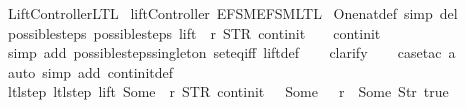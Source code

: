 %
\begin{isabellebody}%
%
%
\isadelimtheory
%
\endisadelimtheory
%
\isatagtheory
{}\isamarkupfalse%
\ Lift{\isacharunderscore}Controller{\isacharunderscore}LTL\isanewline
{}\ liftController{}\ {\isachardoublequoteopen}EFSM{\isachardot}EFSM{\isacharunderscore}LTL{\isachardoublequoteclose}\isanewline
{}%
\endisatagtheory
{\isafoldtheory}%
%
\isadelimtheory
\isanewline
%
\endisadelimtheory
\isanewline
{}\isamarkupfalse%
\ One{\isacharunderscore}nat{\isacharunderscore}def\ {\isacharbrackleft}simp\ del{\isacharbrackright}\isanewline
\isanewline
{}\isamarkupfalse%
\ possible{\isacharunderscore}steps{\isacharunderscore}{}{\isacharcolon}\ {\isachardoublequoteopen}possible{\isacharunderscore}steps\ lift\ {}\ r\ STR\ {\isacharprime}{\isacharprime}continit{\isacharprime}{\isacharprime}\ {\isacharbrackleft}{\isacharbrackright}\ {\isacharequal}\ {\isacharbraceleft}{\isacharbar}{\isacharparenleft}{}{\isacharcomma}\ continit{\isacharparenright}{\isacharbar}{\isacharbraceright}{\isachardoublequoteclose}\isanewline
%
\isadelimproof
\ \ %
\endisadelimproof
%
\isatagproof
{}\isamarkupfalse%
\ {\isacharparenleft}simp\ add{\isacharcolon}\ possible{\isacharunderscore}steps{\isacharunderscore}singleton\ set{\isacharunderscore}eq{\isacharunderscore}iff\ lift{\isacharunderscore}def{\isacharparenright}\isanewline
\ \ \isamarkupfalse%
\ clarify\isanewline
\ \ \isamarkupfalse%
\ {\isacharparenleft}case{\isacharunderscore}tac\ {\isachardoublequoteopen}a{\isacharequal}{}{\isachardoublequoteclose}{\isacharparenright}\isanewline
\ \ \isamarkupfalse%
\ {\isacharparenleft}auto\ simp\ add{\isacharcolon}\ continit{\isacharunderscore}def{\isacharparenright}%
\endisatagproof
{\isafoldproof}%
%
\isadelimproof
\isanewline
%
\endisadelimproof
\isanewline
{}\isamarkupfalse%
\ ltl{\isacharunderscore}step{\isacharunderscore}{}{\isacharcolon}\ {\isachardoublequoteopen}ltl{\isacharunderscore}step\ lift\ {\isacharparenleft}Some\ {}{\isacharparenright}\ r\ {\isacharparenleft}STR\ {\isacharprime}{\isacharprime}continit{\isacharprime}{\isacharprime}{\isacharcomma}\ {\isacharbrackleft}{\isacharbrackright}{\isacharparenright}\ {\isacharequal}\ {\isacharparenleft}Some\ {}{\isacharcomma}\ {\isacharbrackleft}{\isacharbrackright}{\isacharcomma}\ r{\isacharparenleft}{}\ {\isachardollar}{\isacharcolon}{\isacharequal}\ Some\ {\isacharparenleft}Str\ {\isacharprime}{\isacharprime}true{\isacharprime}{\isacharprime}{\isacharparenright}{\isacharparenright}{\isacharparenright}{\isachardoublequoteclose}\isanewline

\end{isabellebody}
